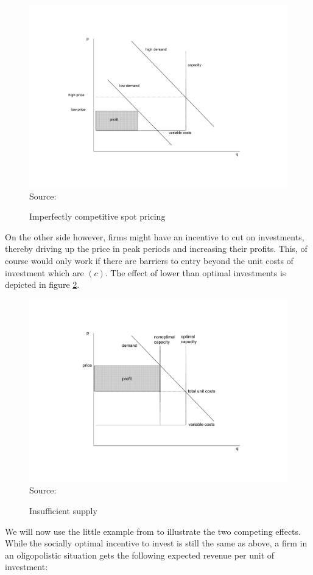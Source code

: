 \begin{figure}[h]
\centering
\caption{Imperfectly competitive spot pricing}
\includegraphics[width=.6\textwidth]{capacity/imperfect_spot_pricing}
      \label{peak_load_toohigh}  
\\          
\scriptsize Source: \cite{Fehr1995}
\end{figure}

On the other side however, firms might have an incentive to cut on investments, thereby driving up the price in peak periods and increasing their profits. This, of course would only work if there are barriers to entry beyond the unit costs of investment which are $(c)$. The effect of lower than optimal investments is depicted in figure \ref{peak_load_insufficient}.

\begin{figure}[h]
\centering
\caption{Insufficient supply}
\includegraphics[width=.6\textwidth]{capacity/imperfect_spot_pricing2}
      \label{peak_load_insufficient}  
\\          
\scriptsize Source: \cite{Fehr1995}
\end{figure}

We will now use the little example from \cite{Fehr1995} to illustrate the two competing effects.
While the socially optimal incentive to invest is still the same as above, a firm in an oligopolistic situation gets the following expected revenue per unit of investment:

